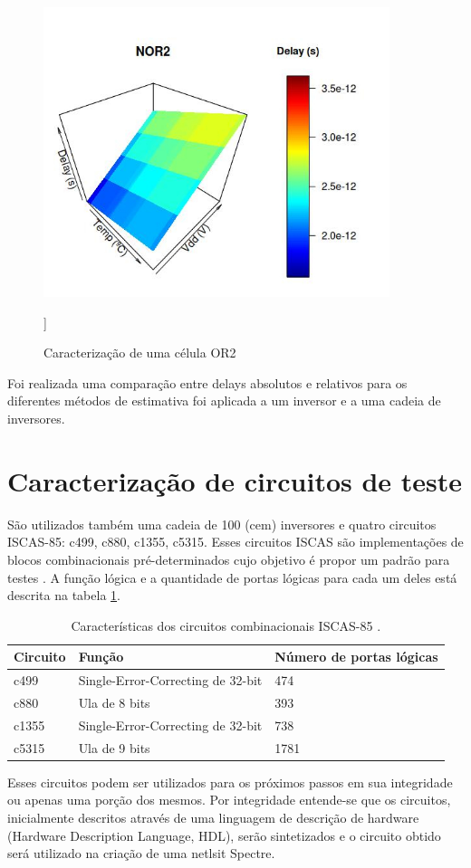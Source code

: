 \begin{figure}[H]
\center
\includegraphics[width=0.9\textwidth]{images/delays_nor2_caracterizacao_200Pontos_gauss80_10}
\caption{Caracterização de uma célula OR2}
\label{figure:delays_nor2_caracterizacao_200Pontos_gauss80_10}]
\end{figure}

Foi realizada uma comparação entre delays absolutos e relativos para os diferentes métodos de estimativa foi aplicada a um inversor e a uma cadeia de inversores.


\section{Caracterização de circuitos de teste}
\label{section:caracterização_iscas}
São utilizados também uma cadeia de 100 (cem) inversores e quatro circuitos ISCAS-85: c499, c880, c1355, c5315. Esses circuitos ISCAS são implementações de blocos combinacionais pré-determinados cujo objetivo é propor um padrão para testes \cite{Hansen1999}. A função lógica e a quantidade de portas lógicas para cada um deles está descrita na tabela \ref{tb:ISCAS_85}.
\begin{table}[H]
\centering
\begin{tabular}{@{}lll@{}}
\toprule
Circuito & Função & Número de portas lógicas \\ \midrule
c499 & Single-Error-Correcting de 32-bit & 474 \\ \midrule
c880 & Ula de 8 bits & 393 \\ \midrule
c1355 & Single-Error-Correcting de 32-bit & 738 \\ \midrule
c5315 & Ula de 9 bits & 1781 \\ \bottomrule
\end{tabular}
\caption{Características dos circuitos combinacionais ISCAS-85 \cite{Hansen1999}.}
\label{tb:ISCAS_85}
\end{table}
Esses circuitos podem ser utilizados para os próximos passos em sua integridade ou apenas uma porção dos mesmos. Por integridade entende-se que os circuitos, inicialmente descritos através de uma linguagem de descrição de hardware (Hardware Description Language, HDL), serão sintetizados e o circuito obtido será utilizado na criação de uma netlsit Spectre. 

